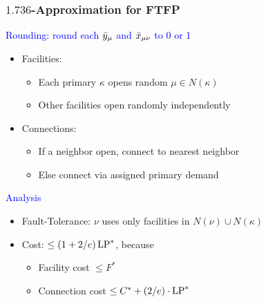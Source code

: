 \documentclass[hyperref,dvipsnames,svgnames,compress]{beamer}
\begin{document}
\begin{frame}
  \frametitle{$1.736$-Approximation for FTFP} 

{\large
  \textcolor{blue}{Rounding: round each ${\bar y}_{\mu}$ and ${\bar x}_{\mu\nu}$ to 0 or 1}

  	\begin{itemize}
  	  	\item  \textcolor{Sepia}{Facilities:} 
			\begin{itemize}
				\item Each primary $\kappa$ opens random $\mu\in N(\kappa)$
				\item Other facilities open randomly independently
			\end{itemize}
	  	\item \textcolor{Sepia}{Connections:} 
	 		\begin{itemize}
					\item If a neighbor open, connect to nearest neighbor
					\item Else connect via assigned primary demand
			\end{itemize}
  	\end{itemize}

\textcolor{blue}{Analysis}

  \begin{itemize}
  	\item \textcolor{Sepia}{Fault-Tolerance:} $\nu$ uses only facilities in
    			$N(\nu) \cup N(\kappa)$
  	\item \textcolor{Sepia}{Cost:} $\le (1+2/e)\,\mbox{\rm LP}^\ast$, because
    	\begin{itemize}
    		\item Facility cost $\le F^\ast$
    		\item Connection cost $\le C^\ast + (2/e)\cdot \mbox{\rm LP}^\ast$
    	\end{itemize}
  \end{itemize}
}
\end{frame}

\end{document}

